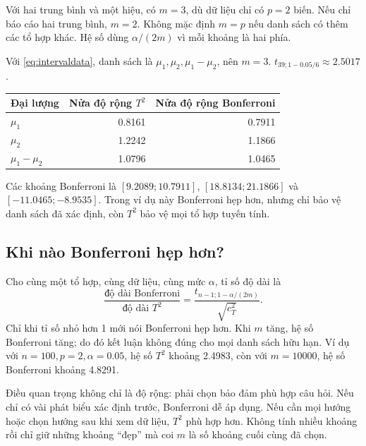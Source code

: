 
Với hai trung bình và một hiệu, có $m=3$, dù dữ liệu chỉ có $p=2$ biến.
Nếu chỉ báo cáo hai trung bình, $m=2$. Không mặc định $m=p$ nếu danh sách
có thêm các tổ hợp khác. Hệ số dùng $\alpha/(2m)$ vì mỗi khoảng là hai phía.

\begin{example}
Với \eqref{eq:intervaldata}, danh sách là
$\mu_1,\mu_2,\mu_1-\mu_2$, nên $m=3$.
$t_{39;1-0.05/6}\approx2.5017$.
\begin{center}
\begin{tabular}{lrr}
\toprule
Đại lượng & Nửa độ rộng $T^2$ & Nửa độ rộng Bonferroni\\
\midrule
$\mu_1$ & 0.8161 & 0.7911\\
$\mu_2$ & 1.2242 & 1.1866\\
$\mu_1-\mu_2$ & 1.0796 & 1.0465\\
\bottomrule
\end{tabular}
\end{center}
Các khoảng Bonferroni là $[9.2089;10.7911]$,
$[18.8134;21.1866]$ và $[-11.0465;-8.9535]$.
Trong ví dụ này Bonferroni hẹp hơn, nhưng chỉ bảo vệ danh sách đã xác định,
còn $T^2$ bảo vệ mọi tổ hợp tuyến tính.
\end{example}



\subsection{Khi nào Bonferroni hẹp hơn?}
Cho cùng một tổ hợp, cùng dữ liệu, cùng mức $\alpha$, tỉ số độ dài là
\begin{equation}
 \frac{\text{độ dài Bonferroni}}{\text{độ dài }T^2}
 =\frac{t_{n-1;1-\alpha/(2m)}}{\sqrt{c_T^2}}.
 \label{eq:widthratio}
\end{equation}
Chỉ khi tỉ số nhỏ hơn 1 mới nói Bonferroni hẹp hơn. Khi $m$ tăng, hệ số
Bonferroni tăng; do đó kết luận không đúng cho mọi danh sách hữu hạn.
Ví dụ với $n=100,p=2,\alpha=0.05$, hệ số $T^2$ khoảng 2.4983,
còn với $m=10000$, hệ số Bonferroni khoảng 4.8291.

Điều quan trọng không chỉ là độ rộng: phải chọn bảo đảm phù hợp câu hỏi.
Nếu chỉ có vài phát biểu xác định trước, Bonferroni dễ áp dụng.
Nếu cần mọi hướng hoặc chọn hướng sau khi xem dữ liệu, $T^2$ phù hợp hơn.
Không tính nhiều khoảng rồi chỉ giữ những khoảng ``đẹp'' mà coi $m$ là
số khoảng cuối cùng đã chọn.

